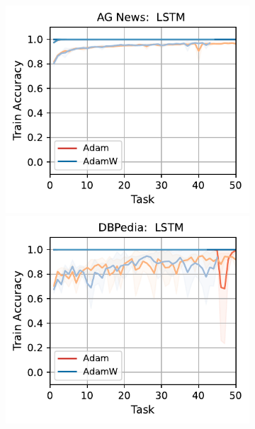 \begin{figure}[htb!]
{\begin{figure}[htb!]
{        \includegraphics[width=\textwidth]{figs/Accuracy/nlp/lstm/ag_news_50.pdf}
        \includegraphics[width=\textwidth]{figs/Accuracy/nlp/lstm/dbpedia_50.pdf}
}
\end{figure}}
\end{figure}
